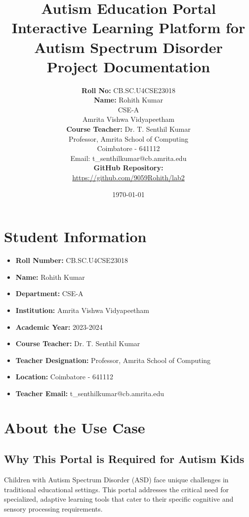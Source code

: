 \documentclass[12pt,a4paper]{article}
\title{
    \vspace{2cm}
    \Huge \textbf{\textcolor{sectioncolor}{Autism Education Portal}} \\
    \vspace{0.5cm}
    \Large \textcolor{maincolor}{Interactive Learning Platform for Autism Spectrum Disorder} \\
    \vspace{1cm}
    \large Project Documentation
    \vspace{2cm}
}
\author{
    \textbf{Roll No:} CB.SC.U4CSE23018 \\
    \textbf{Name:} Rohith Kumar \\
    \vspace{0.5cm}
    CSE-A \\
    Amrita Vishwa Vidyapeetham \\
    \vspace{0.5cm}
    \textbf{Course Teacher:} Dr. T. Senthil Kumar \\
    Professor, Amrita School of Computing \\
    Coimbatore - 641112 \\
    Email: t\_senthilkumar@cb.amrita.edu \\
    \vspace{0.8cm}
    \textbf{GitHub Repository:} \\
    \url{https://github.com/9059Rohith/lab2}
}
\date{\today}
\begin{document}
\maketitle
\thispagestyle{empty}
\newpage

\tableofcontents
\newpage

\section{Student Information}
\begin{itemize}[leftmargin=*]
    \item \textbf{Roll Number:} CB.SC.U4CSE23018
    \item \textbf{Name:} Rohith Kumar
    \item \textbf{Department:} CSE-A
    \item \textbf{Institution:} Amrita Vishwa Vidyapeetham
    \item \textbf{Academic Year:} 2023-2024
    \item \textbf{Course Teacher:} Dr. T. Senthil Kumar
    \item \textbf{Teacher Designation:} Professor, Amrita School of Computing
    \item \textbf{Location:} Coimbatore - 641112
    \item \textbf{Teacher Email:} t\_senthilkumar@cb.amrita.edu
\end{itemize}

\newpage
\section{About the Use Case}

\subsection{Why This Portal is Required for Autism Kids}

Children with Autism Spectrum Disorder (ASD) face unique challenges in traditional educational settings. This portal addresses the critical need for specialized, adaptive learning tools that cater to their specific cognitive and sensory processing requirements. 
\end{document}
